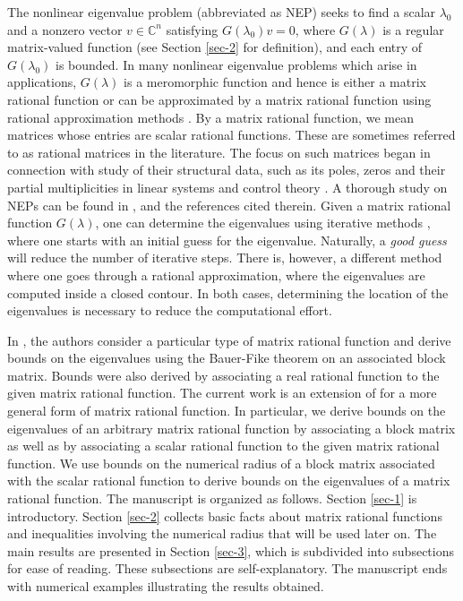 \documentclass[12pt, reqno]{amsart}
\theoremstyle{definition}
\theoremstyle{remark}
\numberwithin{equation}{section}
\begin{document}
The nonlinear eigenvalue problem (abbreviated as NEP) seeks to find a scalar $\lambda_0$ 
and a nonzero vector $v \in \mathbb{C}^n$ satisfying $G(\lambda_0)v=0$, where $G(\lambda)$ 
is a regular matrix-valued function (see Section \ref{sec-2} for definition), and each 
entry of $G(\lambda_0)$ is bounded. In many nonlinear eigenvalue problems which arise in 
applications, $G(\lambda)$ is a meromorphic function and hence is either a 
matrix rational function or can be approximated by a matrix rational function using
rational approximation methods \cite{Saad-Guide-Meidlar}. By a matrix rational function, 
we mean matrices whose entries are scalar rational functions. These are sometimes 
referred to as rational matrices in the literature. The focus on such matrices began in 
connection with study of their structural data, such as its poles, zeros and their partial 
multiplicities in linear systems and control theory \cite{Kailath}. 
A thorough study on NEPs can be found in \cite{Dopico}, \cite{Mehrmann-Voss} and 
the references cited therein. Given a matrix rational function $G(\lambda)$, one can 
determine the eigenvalues using iterative methods \cite{Mehrmann-Voss}, where one starts 
with an initial guess for the eigenvalue. Naturally, a {\it good guess} will reduce the 
number of iterative steps. There is, however, a different method where one goes through a  
rational approximation, where the eigenvalues are computed inside a closed 
contour. In both cases, determining the location of the eigenvalues is necessary 
to reduce the computational effort. 

In \cite{Pallavi}, the authors consider a particular type of matrix rational function 
and derive bounds on the eigenvalues using the Bauer-Fike theorem on an associated block 
matrix. Bounds were also derived by associating a real rational function to the given 
matrix rational function. The current work is an extension of \cite{Pallavi} 
for a more general form of matrix rational function. In particular, we derive bounds on 
the eigenvalues of an arbitrary matrix rational function by associating a block matrix 
as well as by associating a scalar rational function to the given matrix rational function. 
We use bounds on the numerical radius of a block matrix associated with the scalar rational function to derive bounds on the eigenvalues of a matrix rational function. The manuscript 
is organized as follows. Section \ref{sec-1} is introductory. Section \ref{sec-2} collects 
basic facts about matrix rational functions and inequalities involving the numerical 
radius that will be used later on. The main results are presented in Section \ref{sec-3}, 
which is subdivided into subsections for ease of reading. These subsections are 
self-explanatory. The manuscript ends with numerical examples illustrating the results 
obtained. 
\end{document}
